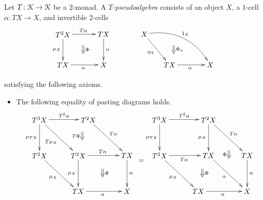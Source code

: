 \begin{Defi}
Let $T \colon \mathcal{K} \rightarrow \mathcal{K}$ be a $2$-monad. A $T$-\textit{pseudoalgebra} consists of an object $X$, a $1$-cell $\alpha \colon TX \rightarrow X$, and invertible $2$-cells
    \[
        \xy
            (0,0)*+{T^2X}="00";
            (20,0)*+{TX}="10";
            (0,-15)*+{TX}="01";
            (20,-15)*+{X}="11";
            {\ar^{T\alpha} "00" ; "10"};
            {\ar^{\alpha} "10" ; "11"};
            {\ar_{\mu_X} "00" ;  "01"};
            {\ar_{\alpha} "01" ; "11"};
            {\ar@{=>}^{\Phi} (10,-5.5) ; (10,-9.5)};
            (40,0)*+{X}="20";
            (52.5,-15)*+{TX}="31";
            (72.5,-15)*+{X}="41";
            {\ar_{\eta_X} "20" ; "31"};
            {\ar_{\alpha} "31" ; "41"};
            {\ar@/^1.5pc/^{1_X} "20" ; "41"};
            {\ar@{=>}^{\Phi_{\eta}} (54.5,-5.5) ; (54.5,-9.5)};
        \endxy
    \]

satisfying the following axioms.
    \begin{itemize}
        \item The following equality of pasting diagrams holds.
    \[
        \xy
            (5,0)*+{T^3X}="t3xl";
            (29,0)*+{T^2X}="t2xl1";
            (5,-17.5)*+{T^2X}="t2xl2";
            (24,-35)*+{TX}="txl1";
            (48,-17.5)*+{TX}="txl2";
            (48,-35)*+{X}="xl";
            (24,-17.5)*+{T^2X}="t2xl3";
            {\ar^{T^2\alpha} "t3xl" ; "t2xl1"};
            {\ar^{T\alpha} "t2xl1" ; "txl2"};
            {\ar^{\alpha} "txl2" ; "xl"};
            {\ar_{\mu_{TX}} "t3xl" ; "t2xl2"};
            {\ar_{\mu_X} "t2xl2" ; "txl1"};
            {\ar_{\alpha} "txl1" ; "xl"};
            {\ar_{T\mu_X} "t3xl" ; "t2xl3"};
            {\ar^{T\alpha} "t2xl3" ; "txl2"};
            {\ar_{\mu_X} "t2xl3" ; "txl1"};
            {\ar@{=>}_{T\Phi} (26,-6) ; (26,-10)};
            {\ar@{=>}^{\Phi} (36,-24) ; (36,-28)};
            (64,0)*+{T^3X}="t3xr";
            (88,0)*+{T^2X}="t2xr1";
            (64,-17.5)*+{T^2X}="t2xr2";
            (83,-35)*+{TX}="txr1";
            (107,-17.5)*+{TX}="txr2";
            (107,-35)*+{X}="xr";
            (88,-17.5)*+{TX}="txr3";
            {\ar^{T^2\alpha} "t3xr" ; "t2xr1"};
            {\ar^{T\alpha} "t2xr1" ; "txr2"};
            {\ar^{\alpha} "txr2" ; "xr"};
            {\ar_{\mu_{TX}} "t3xr" ; "t2xr2"};
            {\ar_{\mu_X} "t2xr2" ; "txr1"};
            {\ar_{\alpha} "txr1" ; "xr"};
            {\ar_{T\alpha} "t2xr2" ; "txr3"};
            {\ar_{\alpha} "txr3" ; "xr"};
            {\ar_{\mu_X} "t2xr1" ; "txr3"};
            {\ar@{=>}_{\Phi} (98,-15) ; (98,-19)};
            {\ar@{=>}^{\Phi} (85,-24) ; (85,-28)};
            {\ar@{=} (54,-20) ; (56,-20)};
        \endxy
    \]


\end{itemize}
\end{Defi}
